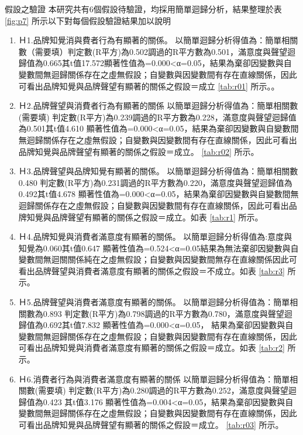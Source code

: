 假設之驗證
本研究共有6個假設待驗證，均採用簡單迴歸分析，結果整理於表 \ref{fig:p7} 所示以下對每個假設驗證結果加以說明
\begin{enumerate}
\item Ｈ1.品牌知覺消與費者行為有顯著的關係。
以簡單迴歸分析得值為：簡單相關數（需要填）判定數(R平方)為0.502調過的R平方數為0.501，滿意度與聲望迴歸值為0.665其t值17.572顯著性值為=0.000<α=0.05，結果為棄卻因變數與自變數間無迴歸關係存在之虛無假設；自變數與因變數間有存在直線關係，因此可看出品牌知覺與品牌聲望有顯著的關係之假設＝成立 \ref{tab:r01}  所示。。
\item Ｈ2.品牌聲望與消費者行為有顯著的關係
以簡單迴歸分析得值為：簡單相關數(需要填) 判定數(R平方)為0.239調過的R平方數為0.228，滿意度與聲望迴歸值為0.501其t值4.610 顯著性值為=0.000<α=0.05，結果為棄卻因變數與自變數間無迴歸關係存在之虛無假設；自變數與因變數間有存在直線關係，因此可看出品牌知覺與品牌聲望有顯著的關係之假設＝成立。 \ref{tab:r02}  所示。
\item Ｈ3.品牌聲望與品牌知覺有顯著的關係。
以簡單迴歸分析得值為：簡單相關數0.480 判定數(R平方)為0.231調過的R平方數為0.220，滿意度與聲望迴歸值為0.492其t值4.678 顯著性值為=0.000<α=0.05，結果為棄卻因變數與自變數間無迴歸關係存在之虛無假設；自變數與因變數間有存在直線關係，因此可看出品牌知覺與品牌聲望有顯著的關係之假設＝成立。如表 \ref{tab:r1}  所示。
\item Ｈ4.品牌知覺與消費者滿意度有顯著的關係。
以簡單迴歸分析得值為:意度與知覺為0.060其t值0.647 顯著性值為=0.524<α=0.05結果為無法棄卻因變數與自變數間無迴關關係純在之虛無假設；自變數與因變數間無存在直線關係因此可看出品牌聲望與消費者滿意度有顯著的關係之假設＝不成立。如表 \ref{tab:r3}  所示。
\item Ｈ5.品牌聲望與消費者滿意度有顯著的關係。
以簡單迴歸分析得值為：簡單相關數為0.893 判定數(R平方)為0.798調過的R平方數為0.780，滿意度與聲望迴歸值為0.692其t值7.832 顯著性值為=0.000<α=0.05， 結果為棄卻因變數與自變數間無迴歸關係存在之虛無假設；自變數與因變數間有存在直線關係，因此可看出品牌知覺與消費者滿意度有顯著的關係之假設＝成立。如表 \ref{tab:r2}  所示。
\item Ｈ6.消費者行為與消費者滿意度有顯著的關係
以簡單迴歸分析得值為：簡單相關數(需要填) 判定數(R平方)為0.280調過的R平方數為0.252，滿意度與聲望迴歸值為0.423 其t值3.176 顯著性值為=0.004<α=0.05，結果為棄卻因變數與自變數間無迴歸關係存在之虛無假設；自變數與因變數間有存在直線關係，因此可看出品牌知覺與品牌聲望有顯著的關係之假設＝成立。 \ref{tab:r03}  所示。
\end{enumerate}


